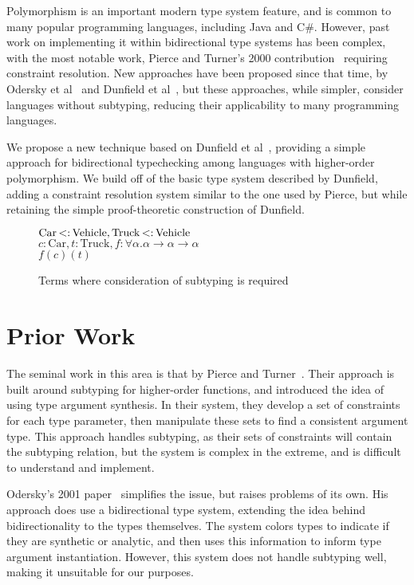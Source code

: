 \documentclass{sig-alternate}
\newcommand{\typeexample}[3]{$#1$\\$#2$\\$#3$}
\newcommand{\st}{\ensuremath{\hspace{-1px}<:\hspace{-1px}}}
\begin{document}
Polymorphism is an important modern type system feature, and is common to many popular programming languages, including Java and C\#. However, past work on implementing it within bidirectional type systems has been complex, with the most notable work, Pierce and Turner's 2000 contribution~\cite{Pierce:2000:LTI:345099.345100} requiring constraint resolution. New approaches have been proposed since that time, by Odersky et al~\cite{odersky2001colored} and Dunfield et al~\cite{Dunfield:2013:CEB:2544174.2500582}, but these approaches, while simpler, consider languages without subtyping, reducing their applicability to many programming languages.

We propose a new technique based on Dunfield et al~\cite{Dunfield:2013:CEB:2544174.2500582}, providing a simple approach for bidirectional typechecking among languages with higher-order polymorphism. We build off of the basic type system described by Dunfield, adding a constraint resolution system similar to the one used by Pierce, but while retaining the simple proof-theoretic construction of Dunfield. 
\begin{figure}
\centering
\label{fig:intro-examples}
\typeexample{\text{Car} \st \text{Vehicle}, \text{Truck} \st \text{Vehicle}}
{c : \text{Car}, t : \text{Truck}, f : \forall \alpha.\alpha \rightarrow \alpha \rightarrow \alpha}
{f(c)(t)}
\caption{Terms where consideration of subtyping is required}
\end{figure}


\section{Prior Work}

The seminal work in this area is that by Pierce and Turner~\cite{Pierce:2000:LTI:345099.345100}. Their approach is built around subtyping for higher-order functions, and introduced the idea of using type argument synthesis. In their system, they develop a set of constraints for each type parameter, then manipulate these sets to find a consistent argument type. This approach handles subtyping, as their sets of constraints will contain the subtyping relation, but the system is complex in the extreme, and is difficult to understand and implement.

Odersky's 2001 paper~\cite{odersky2001colored} simplifies the issue, but raises problems of its own. His approach does use a bidirectional type system, extending the idea behind bidirectionality to the types themselves. The system colors types to indicate if they are synthetic or analytic, and then uses this information to inform type argument instantiation. However, this system does not handle subtyping well, making it unsuitable for our purposes.
\end{document}
